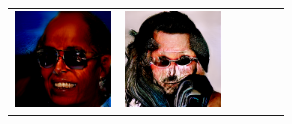 \documentclass{article}
\newcommand{\pganw}{1.0in}
\begin{document}
\begin{table}[htbp]
\begin{center}
\begin{tabular}{cc|cc|cc}
\includegraphics[width=\pganw]{figures/pgan/4_base_raw_reject.png} &
\includegraphics[width=\pganw]{figures/pgan/5_base_raw_base.png} &

\end{tabular}
\end{center}
\end{table}
\end{document}
